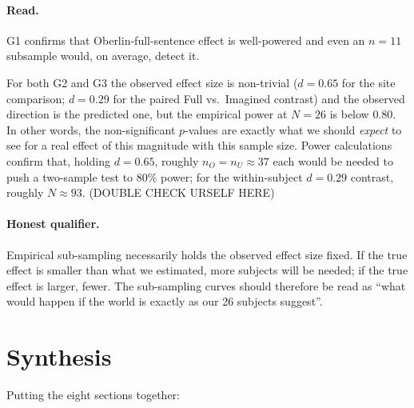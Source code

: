 \documentclass[11pt]{article}
\begin{document}
\paragraph{Read.}
G1 confirms that Oberlin-full-sentence effect is well-powered and even an $n=11$ subsample would, on average,
detect it.

For both G2 and G3 the observed effect size is non-trivial ($d=0.65$ for the
site comparison; $d=0.29$ for the paired Full vs.\ Imagined
contrast) and the observed direction is the predicted one, but the
empirical power at $N=26$ is below $0.80$.  In other words, the
non-significant $p$-values are exactly what we should \emph{expect}
to see for a real effect of this magnitude with this sample size.
Power calculations confirm that, holding $d=0.65$,
roughly $n_O = n_U \approx 37$ each would be needed to push a
two-sample test to 80\% power; for the within-subject
$d=0.29$ contrast, roughly $N \approx 93$. (DOUBLE CHECK URSELF HERE)

\paragraph{Honest qualifier.}
Empirical sub-sampling necessarily holds the observed effect size
fixed.  If the true effect is smaller than what we estimated, more
subjects will be needed; if the true effect is larger, fewer.  The
sub-sampling curves should therefore be read as ``what would happen
if the world is exactly as our 26 subjects suggest''.

\section{Synthesis}

Putting the eight sections together:
\end{document}
